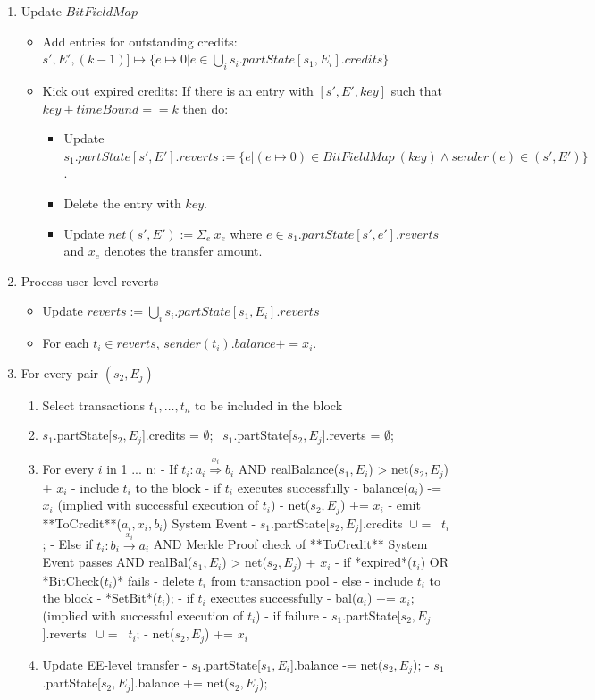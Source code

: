\documentclass{article}
\newcommand{\bitfieldmap}[0]{\ensuremath{BitFieldMap}~}
\begin{document}
\begin{enumerate}
\item Update $\bitfieldmap$
    \begin{itemize}
        \item Add entries for outstanding credits: 
        $s', E', (k-1)] \mapsto \{e \mapsto 0 | e \in \bigcup_i s_i.partState[s_1,E_i].credits\}$
        \item Kick out expired credits: If there is an entry with $[s',E',key]$ such that $key + timeBound == k$ then do:
        \begin{itemize}
            \item Update $s_1.partState[s',E'].reverts := \{ e | (e \mapsto 0) \in \bitfieldmap(key) \wedge sender(e) \in (s',E') \}$.
            \item Delete the entry with $key$.
            \item Update $net(s',E') := \Sigma_e ~x_e$ where $e \in s_1.partState[s',e'].reverts$ and $x_e$ denotes the transfer amount.
        \end{itemize}
    \end{itemize}
\item Process user-level reverts
    \begin{itemize}
	    \item Update $reverts := \bigcup_i s_i.partState[s_1,E_i].reverts$
	    \item For each $t_i \in reverts$, $sender(t_i).balance += x_i$.
    \end{itemize}
\item For every pair $(s_2,E_j)$
    \begin{enumerate}
	\item Select transactions $t_1,\ldots,t_n$ to be included in the block
	\item $s_1$.partState[$s_2,E_j$].credits = $\emptyset$;  $~~s_1$.partState[$s_2,E_j$].reverts = $\emptyset$; 
	\item For every $i$ in 1 ... n: 
		- If $t_i : a_i \stackrel{x_i}{\Longrightarrow} b_i$ AND realBalance($s_1,E_i$) > net($s_2,E_j$) + $x_i$
			- include $t_i$ to the block
			- if $t_i$ executes successfully 
				- balance($a_i$) -= $x_i$ (implied with successful execution of $t_i$)
				- net($s_2,E_j$) += $x_i$
				- emit **ToCredit**($a_i, x_i, b_i$) System Event
				- $s_1$.partState[$s_2,E_j$].credits $~ \cup= ~$ {$t_i$};
		- Else if $t_i : b_i \stackrel{x_i}{\longrightarrow} a_i$ AND Merkle Proof check of **ToCredit** System Event passes AND realBal($s_1,E_i$) > net($s_2,E_j$) + $x_i$
			- if *expired*($t_i$) OR *BitCheck($t_i$)* fails
				- delete $t_i$ from transaction pool
			- else 
				- include $t_i$ to the block
				- *SetBit*($t_i$);
				- if $t_i$ executes successfully
					- bal($a_i$) += $x_i$; (implied with successful execution of $t_i$)
				- if failure 
					- $s_1$.partState[$s_2,E_j$].reverts $~~\cup=~$ {$t_i$};
					- net($s_2,E_j$) += $x_i$ 
	\item Update EE-level transfer
		- $s_1$.partState[$s_1,E_i$].balance -= net($s_2,E_j$); 
		- $s_1$.partState[$s_2,E_j$].balance += net($s_2,E_j$);
    \end{enumerate}
\end{enumerate}
\end{document}
